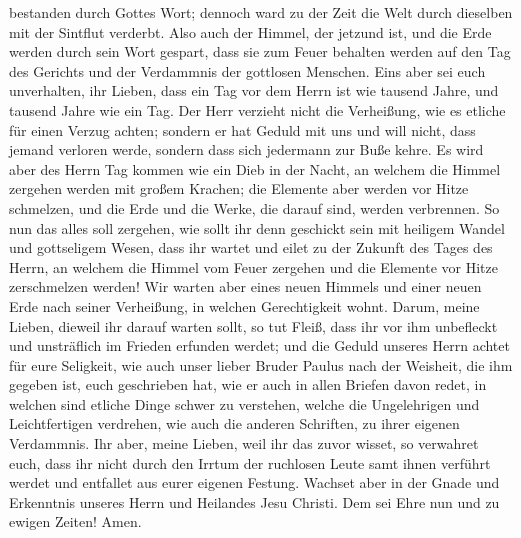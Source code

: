 bestanden durch Gottes Wort;  dennoch ward zu der Zeit die
Welt durch dieselben mit der Sintflut verderbt.  Also auch
der Himmel, der jetzund ist, und die Erde werden durch sein Wort
gespart, dass sie zum Feuer behalten werden auf den Tag des Gerichts und
der Verdammnis der gottlosen Menschen.  Eins aber sei euch
unverhalten, ihr Lieben, dass ein Tag vor dem Herrn ist wie tausend
Jahre, und tausend Jahre wie ein Tag.  Der Herr verzieht
nicht die Verheißung, wie es etliche für einen Verzug achten; sondern er
hat Geduld mit uns und will nicht, dass jemand verloren werde, sondern
dass sich jedermann zur Buße kehre.  Es wird aber des Herrn
Tag kommen wie ein Dieb in der Nacht, an welchem die Himmel zergehen
werden mit großem Krachen; die Elemente aber werden vor Hitze schmelzen,
und die Erde und die Werke, die darauf sind, werden verbrennen.
 So nun das alles soll zergehen, wie sollt ihr denn
geschickt sein mit heiligem Wandel und gottseligem Wesen, 
dass ihr wartet und eilet zu der Zukunft des Tages des Herrn, an welchem
die Himmel vom Feuer zergehen und die Elemente vor Hitze zerschmelzen
werden!  Wir warten aber eines neuen Himmels und einer
neuen Erde nach seiner Verheißung, in welchen Gerechtigkeit wohnt.
 Darum, meine Lieben, dieweil ihr darauf warten sollt, so
tut Fleiß, dass ihr vor ihm unbefleckt und unsträflich im Frieden
erfunden werdet;  und die Geduld unseres Herrn achtet für
eure Seligkeit, wie auch unser lieber Bruder Paulus nach der Weisheit,
die ihm gegeben ist, euch geschrieben hat,  wie er auch in
allen Briefen davon redet, in welchen sind etliche Dinge schwer zu
verstehen, welche die Ungelehrigen und Leichtfertigen verdrehen, wie
auch die anderen Schriften, zu ihrer eigenen Verdammnis. 
Ihr aber, meine Lieben, weil ihr das zuvor wisset, so verwahret euch,
dass ihr nicht durch den Irrtum der ruchlosen Leute samt ihnen verführt
werdet und entfallet aus eurer eigenen Festung.  Wachset
aber in der Gnade und Erkenntnis unseres Herrn und Heilandes Jesu
Christi. Dem sei Ehre nun und zu ewigen Zeiten! Amen.
